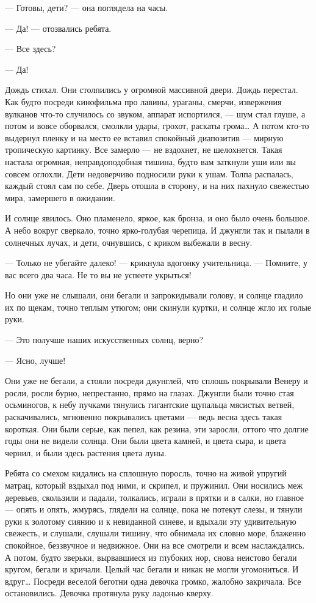 — Готовы, дети? — она поглядела на часы.

— Да! — отозвались ребята.

— Все здесь?

— Да!

Дождь стихал. Они столпились у огромной массивной двери. Дождь перестал. Как
будто посреди кинофильма про лавины, ураганы, смерчи, извержения вулканов
что-то случилось со звуком, аппарат испортился, — шум стал глуше, а потом и
вовсе оборвался, смолкли удары, грохот, раскаты грома… А потом кто-то выдернул
пленку и на место ее вставил спокойный диапозитив — мирную тропическую
картинку. Все замерло — не вздохнет, не шелохнется. Такая настала огромная,
неправдоподобная тишина, будто вам заткнули уши или вы совсем оглохли. Дети
недоверчиво подносили руки к ушам. Толпа распалась, каждый стоял сам по себе.
Дверь отошла в сторону, и на них пахнуло свежестью мира, замершего в ожидании.

И солнце явилось. Оно пламенело, яркое, как бронза, и оно было очень большое. А
небо вокруг сверкало, точно ярко-голубая черепица. И джунгли так и пылали в
солнечных лучах, и дети, очнувшись, с криком выбежали в весну.

— Только не убегайте далеко! — крикнула вдогонку учительница. — Помните, у вас
всего два часа. Не то вы не успеете укрыться!

Но они уже не слышали, они бегали и запрокидывали голову, и солнце гладило их
по щекам, точно теплым утюгом; они скинули куртки, и солнце жгло их голые руки.

— Это получше наших искусственных солнц, верно?

— Ясно, лучше!

Они уже не бегали, а стояли посреди джунглей, что сплошь покрывали Венеру и
росли, росли бурно, непрестанно, прямо на глазах. Джунгли были точно стая
осьминогов, к небу пучками тянулись гигантские щупальца мясистых ветвей,
раскачивались, мгновенно покрывались цветами — ведь весна здесь такая короткая.
Они были серые, как пепел, как резина, эти заросли, оттого что долгие годы они
не видели солнца. Они были цвета камней, и цвета сыра, и цвета чернил, и были
здесь растения цвета луны.

Ребята со смехом кидались на сплошную поросль, точно на живой упругий матрац,
который вздыхал под ними, и скрипел, и пружинил. Они носились меж деревьев,
скользили и падали, толкались, играли в прятки и в салки, но главное — опять и
опять, жмурясь, глядели на солнце, пока не потекут слезы, и тянули руки к
золотому сиянию и к невиданной синеве, и вдыхали эту удивительную свежесть, и
слушали, слушали тишину, что обнимала их словно море, блаженно спокойное,
беззвучное и недвижное. Они на все смотрели и всем наслаждались. А потом, будто
зверьки, вырвавшиеся из глубоких нор, снова неистово бегали кругом, бегали и
кричали. Целый час бегали и никак не могли угомониться. И вдруг… Посреди
веселой беготни одна девочка громко, жалобно закричала. Все остановились.
Девочка протянула руку ладонью кверху.

